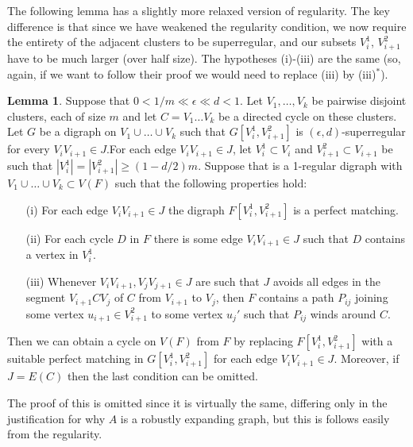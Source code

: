 \documentclass[10pt,letterpaper, reqno]{amsart}
\theoremstyle{definition}
\newtheorem{lemma}[thm]{Lemma}
\numberwithin{equation}{section}
\begin{document}
The following lemma has a slightly more relaxed version of regularity. The key difference is that since we have weakened the regularity condition, we now require the entirety of the adjacent clusters to be superregular, and our subsets $V^1_i$, $V^2_{i+1}$ have to be much larger (over half size). The hypotheses (i)-(iii) are the same (so, again, if we want to follow their proof we would need to replace (iii) by (iii)$^*$).

\begin{lemma}\label{6.5}
	Suppose that $0 < 1/m \ll  \epsilon \ll d < 1$. Let $V_1, \dots, V_k$ be pairwise disjoint clusters, each of size $m$ and let $C=V_1\dots V_k$ be a directed cycle on these clusters. Let $G$ be a digraph on $V_1 \cup \dots \cup V_k$ such that $G[V_i^1, V^2_{i+1}]$ is $(\epsilon, d)$-superregular for every $V_iV_{i+1} \in J$.For each edge $V_{i}V_{i+1} \in J$, let $V_i^1 \subset V_i$ and $V_{i+1}^2 \subset V_{i+1}$ be such that $|V_i^1|=|V_{i+1}^2| \geq (1-d/2)m$. Suppose that is a 1-regular digraph with $V_1 \cup \dots \cup V_k \subset V(F)$ such that the following properties hold:
	\begin{enumerate}
		\item[(i)] For each edge $V_i V_{i+1} \in J$ the digraph $F[V_i^1, V_{i+1}^2]$ is a perfect matching.
		\item[(ii)] For each cycle $D$ in $F$ there is some edge $V_i V_{i+1} \in J$ such that $D$ contains a vertex in $V_i^1$.
		\item[(iii)] Whenever $V_i V_{i+1}, V_j V_{j+1} \in J$ are such that $J$ avoids all edges in the segment $V_{i+1}CV_j$ of $C$ from $V_{i+1}$ to $V_j$, then $F$ contains a path $P_{ij}$ joining some vertex $u_{i+1} \in V^2_{i+1}$ to some vertex $u_j'$ such that $P_{ij}$ winds around $C$.
	\end{enumerate}
	Then we can obtain a cycle on $V(F)$ from $F$ by replacing $F[V_{i}^1, V^2_{i+1}]$ with a suitable perfect matching in $G[V_i^1,V_{i+1}^2]$ for each edge $V_i V_{i+1} \in J$. Moreover, if $J=E(C)$ then the last condition can be omitted.\end{lemma}

\noindent The proof of this is omitted since it is virtually the same, differing only in the justification for why $A$ is a robustly expanding graph, but this is follows easily from the regularity. 
\end{document}
